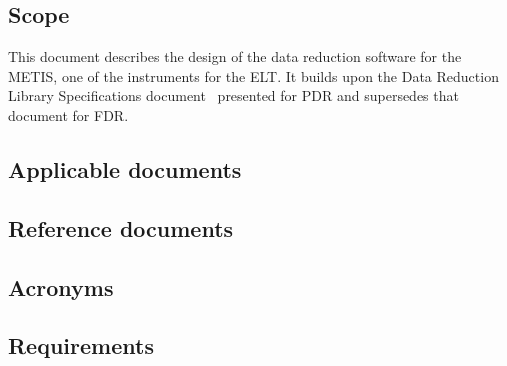 \documentclass[11pt,oneside,a4paper]{article}
\begin{document}
\subsection{Scope}

This document describes the design of the data reduction software for the \ac{METIS}, one of the instruments for the \ac{ELT}. It builds upon
the Data Reduction Library Specifications document~\cite{DRLS}
presented for \ac{PDR} and supersedes that document for \ac{FDR}.

\subsection{Applicable documents}

\begin{refcontext}[labelprefix=AD]
  \printbibliography[keyword=applicable, heading=none]
\end{refcontext}


\subsection{Reference documents}

\begin{refcontext}[labelprefix=RD]
  \printbibliography[keyword=reference, heading=none]
\end{refcontext}

\subsection{Acronyms}
\label{ssec:acronyms}


\subsection{Requirements}
\label{ssec:requirements}


\clearpage







% 


\clearpage
% 

\clearpage

\end{document}
